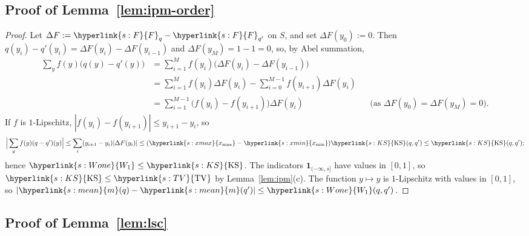 \documentclass[11pt]{article}
\newcommand{\ind}{\mathbf{1}}
\newcommand{\sy}[2]{{\hyperlink{#1}{#2}}}
\newcommand{\xmax}{\sy{s:xmax}{x_{\max}}}
\newcommand{\xmin}{\sy{s:xmin}{x_{\min}}}
\newcommand{\mean}{\sy{s:mean}{m}}
\newcommand{\Fd}{\sy{s:F}{F}}
\newcommand{\TV}{\sy{s:TV}{\mathrm{TV}}}
\newcommand{\KSd}{\sy{s:KS}{\mathrm{KS}}}
\newcommand{\Wone}{\sy{s:Wone}{W_{1}}}
\begin{document}
\subsection{Proof of Lemma~\ref{lem:ipm-order}}\label{sec:proof-lem-ipm-order}

\begin{proof}
Let $\Delta F:=\Fd_q-\Fd_{q'}$ on $S$, and set $\Delta F(y_0):=0$. Then
$q(y_i)-q'(y_i)=\Delta F(y_i)-\Delta F(y_{i-1})$ and $\Delta F(y_M)=1-1=0$, so, by Abel summation,
\begin{align*}
\sum_yf(y)\big(q(y)-q'(y)\big)&=\sum_{i=1}^{M}f(y_i)\big(\Delta F(y_i)-\Delta F(y_{i-1})\big)\\
&=\sum_{i=1}^{M}f(y_i)\Delta F(y_i)-\sum_{i=0}^{M-1}f(y_{i+1})\Delta F(y_i)\\
&=\sum_{i=1}^{M-1}\big(f(y_i)-f(y_{i+1})\big)\Delta F(y_i) && \text{(as $\Delta F(y_0)=\Delta F(y_M)=0$).}
\end{align*}
If $f$ is $1$-Lipschitz, $|f(y_i)-f(y_{i+1})|\le y_{i+1}-y_i$, so
\begin{equation*}
\Big|\sum_yf(y)(q-q')(y)\Big|\le\sum_i(y_{i+1}-y_i)|\Delta F(y_i)|\le(\xmax-\xmin)\KSd(q,q')\le\KSd(q,q');
\end{equation*}
hence $\Wone\le\KSd$. The indicators $\ind_{(-\infty,s]}$ have values in $[0,1]$, so $\KSd\le\TV$ by
Lemma~\ref{lem:ipm}(c). The function $y\mapsto y$ is $1$-Lipschitz with values in $[0,1]$, so
$|\mean(q)-\mean(q')|\le \Wone(q,q')$.
\end{proof}

\subsection{Proof of Lemma~\ref{lem:lsc}}\label{sec:proof-lem-lsc}
\end{document}
